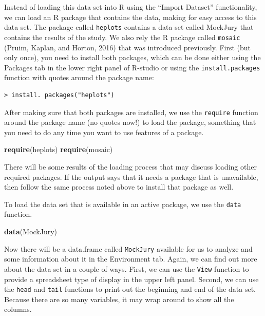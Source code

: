\documentclass[]{book}
\newenvironment{Shaded}{\begin{snugshade}}{\end{snugshade}}
\newcommand{\KeywordTok}[1]{\textcolor[rgb]{0.13,0.29,0.53}{\textbf{{#1}}}}
\newcommand{\NormalTok}[1]{{#1}}
\begin{document}
Instead of loading this data set into R using the ``Import Dataset''
functionality, we can load an R package that contains the data, making
for easy access to this data set. The package called \texttt{heplots}
contains a data set called MockJury that contains the results of the
study. We also rely the R package called \texttt{mosaic} (Pruim, Kaplan,
and Horton, 2016) that was introduced previously. First (but only once),
you need to install both packages, which can be done either using the
Packages tab in the lower right panel of R-studio or using the
\texttt{install.packages} function with quotes around the package name:

\begin{verbatim}
> install. packages("heplots")
\end{verbatim}

After making sure that both packages are installed, we use the
\texttt{require} function around the package name (no quotes now!) to
load the package, something that you need to do any time you want to use
features of a package.

\begin{Shaded}
\begin{Highlighting}[]
\KeywordTok{require}\NormalTok{(heplots)}
\KeywordTok{require}\NormalTok{(mosaic)}
\end{Highlighting}
\end{Shaded}

There will be some results of the loading process that may discuss
loading other required packages. If the output says that it needs a
package that is unavailable, then follow the same process noted above to
install that package as well.

To load the data set that is available in an active package, we use the
\texttt{data} function.

\begin{Shaded}
\begin{Highlighting}[]
\KeywordTok{data}\NormalTok{(MockJury)}
\end{Highlighting}
\end{Shaded}

Now there will be a data.frame called \texttt{MockJury} available for us
to analyze and some information about it in the Environment tab. Again,
we can find out more about the data set in a couple of ways. First, we
can use the \texttt{View} function to provide a spreadsheet type of
display in the upper left panel. Second, we can use the \texttt{head}
and \texttt{tail} functions to print out the beginning and end of the
data set. Because there are so many variables, it may wrap around to
show all the columns.
\end{document}
